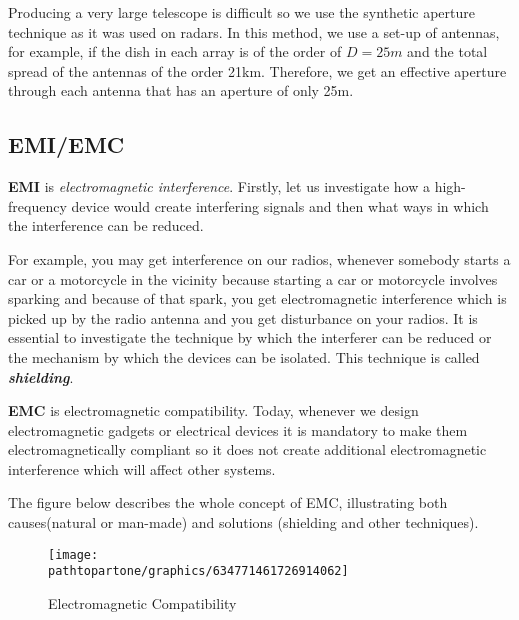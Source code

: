 Producing a very large telescope is difficult so we use the synthetic aperture technique as it was used on radars. In this method, we use a set-up of antennas, for example, if the dish in each array is of the order of $ D = 25m $ and the total spread of the antennas of the order 21km. Therefore, we get an effective aperture through each antenna that has an aperture of only 25m.

\subsection{EMI/EMC}

\textbf{EMI} is \textit{electromagnetic interference}. Firstly, let us investigate how a high-frequency device would create interfering signals and then what ways in which the interference can be reduced.

For example, you may get interference on our radios, whenever somebody starts a car or a motorcycle in the vicinity because starting a car or motorcycle involves sparking and because of that spark, you get electromagnetic interference which is picked up by the radio antenna and you get disturbance on your radios. It is essential to investigate the technique by which the interferer can be reduced or the mechanism by which the devices can be isolated. This technique is called \textit{\textbf{shielding}}.

\textbf{EMC} is electromagnetic compatibility. Today, whenever we design electromagnetic gadgets or electrical devices it is mandatory to make them electromagnetically compliant so it does not create additional electromagnetic interference which will affect other systems.

The figure below describes the whole concept of EMC, illustrating both causes(natural or man-made) and solutions (shielding and other techniques).

\begin{figure}[h]
\centering
\texttt{[image: \\pathtopartone/graphics/634771461726914062]}
\caption{Electromagnetic Compatibility}
\label{fig:634771461726914062}
\end{figure}

\newpage


